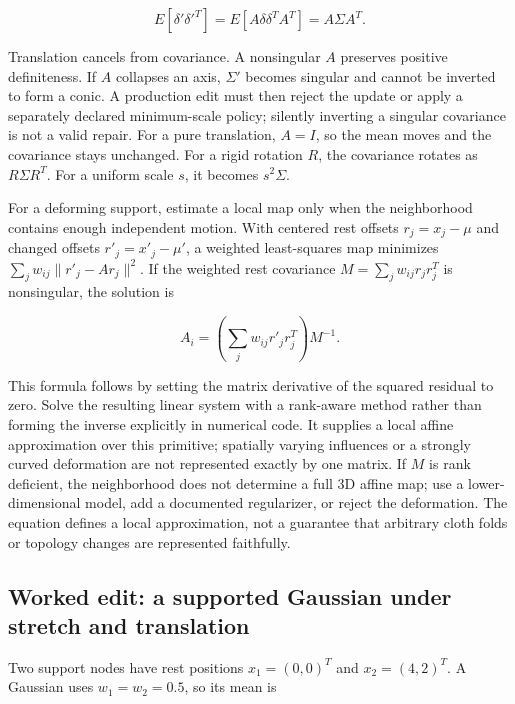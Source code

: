 \[
E[\delta'\delta'^T]=E[A\delta\delta^TA^T]=A\Sigma A^T.
\]

Translation cancels from covariance. A nonsingular \(A\) preserves positive definiteness. If \(A\) collapses an axis, \(\Sigma'\) becomes singular and cannot be inverted to form a conic. A production edit must then reject the update or apply a separately declared minimum-scale policy; silently inverting a singular covariance is not a valid repair. For a pure translation, \(A=I\), so the mean moves and the covariance stays unchanged. For a rigid rotation \(R\), the covariance rotates as \(R\Sigma R^T\). For a uniform scale \(s\), it becomes \(s^2\Sigma\).

For a deforming support, estimate a local map only when the neighborhood contains enough independent motion. With centered rest offsets \(r_j=x_j-\mu\) and changed offsets \(r'_j=x'_j-\mu'\), a weighted least-squares map minimizes \(\sum_jw_{ij}\|r'_j-Ar_j\|^2\). If the weighted rest covariance \(M=\sum_jw_{ij}r_jr_j^T\) is nonsingular, the solution is

\[
A_i=\left(\sum_jw_{ij}r'_jr_j^T\right)M^{-1}.
\]

This formula follows by setting the matrix derivative of the squared residual to zero. Solve the resulting linear system with a rank-aware method rather than forming the inverse explicitly in numerical code. It supplies a local affine approximation over this primitive; spatially varying influences or a strongly curved deformation are not represented exactly by one matrix. If \(M\) is rank deficient, the neighborhood does not determine a full 3D affine map; use a lower-dimensional model, add a documented regularizer, or reject the deformation. The equation defines a local approximation, not a guarantee that arbitrary cloth folds or topology changes are represented faithfully.

\subsection{Worked edit: a supported Gaussian under stretch and translation}\label{04-visual-computing-ii-ch039-worked-edit-a-supported-gaussian-under-stretch-and-translation}

\hypertarget{04-visual-computing-ii-ch039-worked-edit-a-supported-gaussian-under-stretch-and-translation}{}

Two support nodes have rest positions \(x_1=(0,0)^T\) and \(x_2=(4,2)^T\). A Gaussian uses \(w_1=w_2=0.5\), so its mean is

